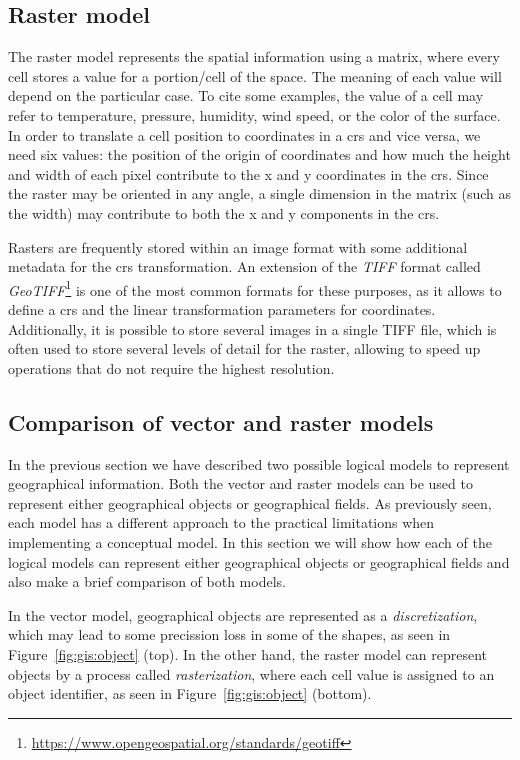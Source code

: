     \subsection{Raster model}
    \label{sec:raster}
    The raster model represents the spatial information using a matrix, where every cell stores a value for a portion/cell of the space. The meaning of each value will depend on the particular case. To cite some examples, the value of a cell may refer to temperature, pressure, humidity, wind speed, or the color of the surface. In order to translate a cell position to coordinates in a \gls{crs} and vice versa, we need six values: the position of the origin of coordinates and how much the height and width of each pixel contribute to the x and y coordinates in the \gls{crs}. Since the raster may be oriented in any angle, a single dimension in the matrix (such as the width) may contribute to both the x and y components in the \gls{crs}.
    
    Rasters are frequently stored within an image format with some additional metadata for the \gls{crs} transformation. An extension of the {\em TIFF} format called {\em GeoTIFF}\footnote{\url{https://www.opengeospatial.org/standards/geotiff}} is one of the most common formats for these purposes, as it allows to define a \gls{crs} and the linear transformation parameters for coordinates. Additionally, it is possible to store several images in a single TIFF file, which is often used to store several levels of detail for the raster, allowing to speed up operations that do not require the highest resolution.

    \subsection{Comparison of vector and raster models}
    In the previous section we have described two possible logical models to represent geographical information. Both the vector and raster models can be used to represent either geographical objects or geographical fields. As previously seen, each model has a different approach to the practical limitations when implementing a conceptual model. In this section we will show how each of the logical models can represent either geographical objects or geographical fields and also make a brief comparison of both models.
    
    In the vector model, geographical objects are represented as a \textit{discretization}, which may lead to some precission loss in some of the shapes, as seen in Figure~\ref{fig:gis:object} (top). In the other hand, the raster model can represent objects by a process called \textit{rasterization}, where each cell value is assigned to an object identifier, as seen in Figure~\ref{fig:gis:object} (bottom).
    
